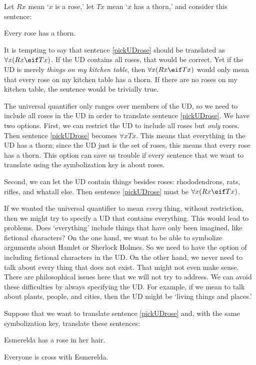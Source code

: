 Let $Rx$ mean `$x$ is a rose,' let $Tx$ mean `$x$ has a thorn,' and consider this sentence:
\begin{earg}
\item[\ex{pickUDrose}] Every rose has a thorn.
\end{earg}

It is tempting to say that sentence \ref{pickUDrose} should be translated as $\forall x(Rx \eif Tx)$. If the UD contains all roses, that would be correct. Yet if the UD is merely \emph{things on my kitchen table}, then $\forall x(Rx \eif Tx)$ would only mean that every rose on my kitchen table has a thorn. If there are no roses on my kitchen table, the sentence would be trivially true.

The universal quantifier only ranges over members of the UD, so we need to include all roses in the UD in order to translate sentence \ref{pickUDrose}. We have two options. First, we can restrict the UD to include all roses but \emph{only} roses. Then sentence \ref{pickUDrose} becomes $\forall x Tx$. This means that everything in the UD has a thorn; since the UD just is the set of roses, this means that every rose has a thorn. This option can save us trouble if every sentence that we want to translate using the symbolization key is about roses.

Second, we can let the UD contain things besides roses: rhododendrons, rats, rifles, and whatall else. Then sentence \ref{pickUDrose} must be $\forall x(Rx \eif Tx)$.

If we wanted the universal quantifier to mean \emph{every} thing, without restriction, then we might try to specify a UD that contains everything. This would lead to problems. Does `everything' include things that have only been imagined, like fictional characters? On the one hand, we want to be able to symbolize arguments about Hamlet or Sherlock Holmes. So we need to have the option of including fictional characters in the UD. On the other hand, we never need to talk about every thing that does not exist. That might not even make sense. There are philosophical issues here that we will not try to address. We can avoid these difficulties by always specifying the UD. For example, if we mean to talk about plants, people, and cities, then the UD might be `living things and places.'

Suppose that we want to translate sentence \ref{pickUDrose} and, with the same symbolization key, translate these sentences:

\begin{earg}
\item[\ex{pickUDhair}] Esmerelda has a rose in her hair.
\item[\ex{pickUDcross}] Everyone is cross with Esmerelda.
\end{earg}

